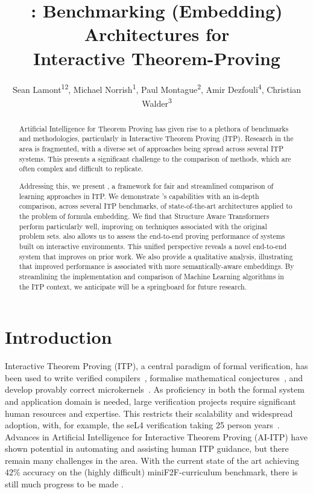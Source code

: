 \documentclass[letterpaper]{article} %
\title{\sysname{}: Benchmarking (Embedding) Architectures for\\Interactive Theorem-Proving}
\author{
    Sean Lamont\textsuperscript{\rm 12},
    Michael Norrish\textsuperscript{\rm 1},
    Paul Montague\textsuperscript{\rm 2},
    Amir Dezfouli\textsuperscript{\rm 4},
    Christian Walder\textsuperscript{\rm 3}
}
\newcommand{\sysname}{\textsc{\sffamily{Bait}}}
\begin{document}
    \maketitle



    \begin{abstract}
        Artificial Intelligence for Theorem Proving has given rise to a plethora of benchmarks and
        methodologies, particularly in Interactive Theorem Proving (ITP).
        Research in the area is fragmented, with a diverse set of approaches being spread across several ITP systems.
        This presents a significant challenge to the comparison of methods, which are often complex and difficult to replicate.

        Addressing this, we present \sysname{},
        a framework for fair and streamlined
        comparison of learning approaches in ITP.
        We demonstrate \sysname{}'s capabilities with an in-depth comparison, across several ITP benchmarks, of state-of-the-art architectures applied to the problem of formula embedding.
        We find that Structure Aware Transformers perform particularly well, improving on techniques associated with the original problem sets.
        \sysname{} also allows us to assess the end-to-end proving performance of systems built on interactive environments.
        This unified perspective reveals a novel end-to-end system that improves on prior work.
        We also provide a qualitative analysis, illustrating that improved
        performance is associated with more semantically-aware embeddings.
        By streamlining the implementation and comparison of Machine Learning algorithms in the ITP context, we anticipate \sysname{} will be a springboard for future
        research.
    \end{abstract}


    \section{Introduction}
    Interactive Theorem Proving (ITP), a central paradigm of formal verification,
    has been used to write verified compilers~\cite{leroy_compcert_2014, tan_verified_2019},
    formalise mathematical conjectures~\cite{gonthier_four_2008}, and develop provably correct microkernels~\cite{klein_sel4_2009}.
    As proficiency in both the formal system and application domain is needed,
    large verification projects require significant human resources and expertise.
    This restricts their scalability and widespread adoption, with, for example, the seL4 verification taking 25 person years~\cite{klein_sel4_2009}.
    Advances in Artificial Intelligence for Interactive Theorem Proving (AI-ITP) have shown potential in automating
    and assisting human ITP guidance, but there remain many challenges in the area.
    With the current state of the art achieving $42\%$ accuracy on the (highly difficult) miniF2F-curriculum benchmark, there is still much progress to be made \cite{lample_hypertree_2022, zheng_minif2f_2021}.
\end{document}
